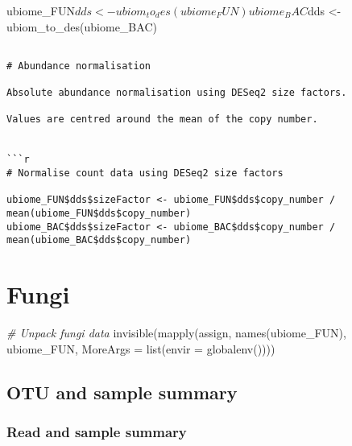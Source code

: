 \documentclass[
]{article}
\newenvironment{Shaded}{\begin{snugshade}}{\end{snugshade}}
\newcommand{\AttributeTok}[1]{\textcolor[rgb]{0.77,0.63,0.00}{#1}}
\newcommand{\CommentTok}[1]{\textcolor[rgb]{0.56,0.35,0.01}{\textit{#1}}}
\newcommand{\FunctionTok}[1]{\textcolor[rgb]{0.00,0.00,0.00}{#1}}
\newcommand{\NormalTok}[1]{#1}
\begin{document}
ubiome\_FUN\(dds <- ubiom_to_des(ubiome_FUN) ubiome_BAC\)dds \textless-
ubiom\_to\_des(ubiome\_BAC)

\begin{verbatim}

# Abundance normalisation

Absolute abundance normalisation using DESeq2 size factors.

Values are centred around the mean of the copy number.


```r
# Normalise count data using DESeq2 size factors

ubiome_FUN$dds$sizeFactor <- ubiome_FUN$dds$copy_number / mean(ubiome_FUN$dds$copy_number)
ubiome_BAC$dds$sizeFactor <- ubiome_BAC$dds$copy_number / mean(ubiome_BAC$dds$copy_number)
\end{verbatim}

\hypertarget{fungi}{%
\section{\texorpdfstring{\textbf{Fungi}}{Fungi}}\label{fungi}}

\begin{Shaded}
\begin{Highlighting}[]
\CommentTok{\# Unpack fungi data}
\FunctionTok{invisible}\NormalTok{(}\FunctionTok{mapply}\NormalTok{(assign, }\FunctionTok{names}\NormalTok{(ubiome\_FUN), ubiome\_FUN, }\AttributeTok{MoreArgs =} \FunctionTok{list}\NormalTok{(}\AttributeTok{envir =} \FunctionTok{globalenv}\NormalTok{())))}
\end{Highlighting}
\end{Shaded}

\hypertarget{otu-and-sample-summary}{%
\subsection{OTU and sample summary}\label{otu-and-sample-summary}}

\hypertarget{read-and-sample-summary}{%
\subsubsection{Read and sample summary}\label{read-and-sample-summary}}
\end{document}
